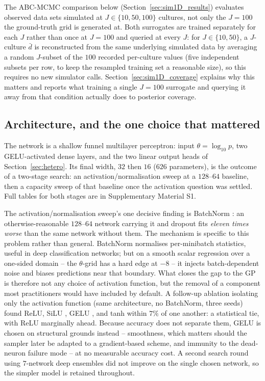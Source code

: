 \documentclass[sn-basic,iicol,pdflatex]{sn-jnl}
\newcommand{\dbar}{\ensuremath{\bar d}}
\begin{document}
The ABC-MCMC comparison below (Section~\ref{sec:sim1D_results}) evaluates
observed data sets simulated at $J \in \{10, 50, 100\}$ cultures, not only the
$J=100$ the ground-truth grid is generated at. Both surrogates are trained
separately for each $J$ rather than once at $J=100$ and queried at every $J$:
for $J \in \{10, 50\}$, a $J$-culture $\dbar$ is reconstructed from the same
underlying simulated data by averaging a random $J$-subset of the $100$
recorded per-culture values (five independent subsets per row, to keep the
resampled training set a reasonable size), so this requires no new simulator
calls. Section~\ref{sec:sim1D_coverage} explains why this matters and reports
what training a single $J=100$ surrogate and querying it away from that
condition actually does to posterior coverage.

\subsection{Architecture, and the one choice that mattered}
\label{sec:arch1D}

The network is a shallow funnel multilayer perceptron: input
$\theta=\log_{10}p$, two GELU-activated dense layers, and the two linear
output heads of Section~\ref{sec:hetero}. Its final width, $32$ then $16$
($626$ parameters), is the outcome of a two-stage search: an
activation/normalisation sweep at a $128$--$64$ baseline, then a capacity
sweep of that baseline once the activation question was settled. Full tables
for both stages are in Supplementary Material S1.

The activation/normalisation sweep's one decisive finding is BatchNorm
\citep{ioffe2015}: an otherwise-reasonable $128$--$64$ network carrying it
and dropout fits \emph{eleven times worse} than the same network without
them. The mechanism is specific to this problem rather than general.
BatchNorm normalises per-minibatch statistics, useful in deep classification
networks; but on a smooth scalar regression over a one-sided domain -- the
$\theta$-grid has a hard edge at $-8$ -- it injects batch-dependent noise and
biases predictions near that boundary. What closes the gap to the GP is
therefore not any choice of activation function, but the removal of a
component most practitioners would have included by default. A follow-up
ablation isolating only the activation function (same architecture, no
BatchNorm, three seeds) found ReLU, SiLU \citep{elfwing2018}, GELU
\citep{hendrycks2016}, and tanh within $7\%$ of one another: a statistical
tie, with ReLU marginally ahead. Because accuracy does not separate them,
GELU is chosen on structural grounds instead -- smoothness, which matters
should the sampler later be adapted to a gradient-based scheme, and immunity
to the dead-neuron failure mode -- at no measurable accuracy cost. A second
search round using $7$-network deep ensembles did not improve on the single
chosen network, so the simpler model is retained throughout.
\end{document}
